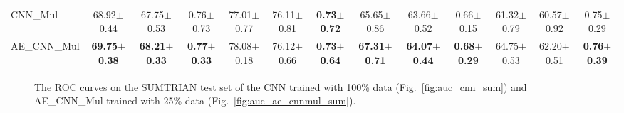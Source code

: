 \begin{table}[ht]
\begin{adjustbox}{width=\textwidth}
\begin{tabular}{lcccccccccccc}
CNN\_Mul        & 68.92$\pm$0.44          & 67.75$\pm$0.53          & 0.76$\pm$0.73          & 77.01$\pm$0.77          & 76.11$\pm$0.81          & \textbf{0.73$\pm$0.72} & 65.65$\pm$0.86          & 63.66$\pm$0.52          & 0.66$\pm$0.15          & 61.32$\pm$0.79          & 60.57$\pm$0.92          & 0.75$\pm$0.29          \\
AE\_CNN\_Mul    & \textbf{69.75$\pm$0.38} & \textbf{68.21$\pm$0.33} & \textbf{0.77$\pm$0.33} & 78.08$\pm$0.18          & 76.12$\pm$0.66          & \textbf{0.73$\pm$0.64} & \textbf{67.31$\pm$0.71} & \textbf{64.07$\pm$0.44} & \textbf{0.68$\pm$0.29} & 64.75$\pm$0.53          & 62.20$\pm$0.51          & \textbf{0.76$\pm$0.39} \\ \hline
\end{tabular}
\end{adjustbox}
\end{table}

\begin{figure}[]
  \centering
  \hfill %
  \caption{The ROC curves on the SUMTRIAN test set of the CNN trained with 100\% data (Fig.~\ref{fig:auc_cnn_sum}) and AE\_CNN\_Mul trained with 25\% data (Fig.~\ref{fig:auc_ae_cnnmul_sum}).}
 \label{fig:auc_sum}
\end{figure}

